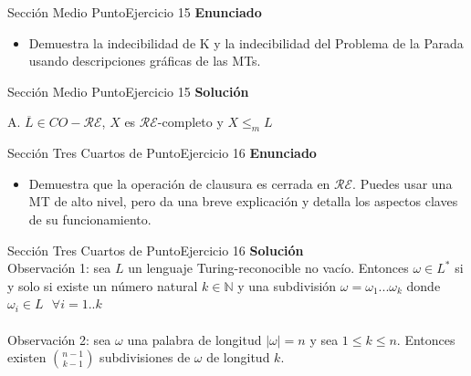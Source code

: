 \documentclass[10pt, envcountsect, presentation, aspectratio=169]{beamer}
\newcommand{\lr}{\ensuremath{\mathcal {RE}}}
\begin{document}
\begin{frame}{Sección Medio Punto}{Ejercicio 15}
    \textbf{Enunciado}
    \begin{itemize}
        \item Demuestra la indecibilidad de K y la indecibilidad del Problema de la Parada usando descripciones gráficas de las MTs.
    \end{itemize}
\end{frame}


\begin{frame}{Sección Medio Punto}{Ejercicio 15}
    \textbf{Solución}\\
    \begin{center}
        A. $\overline{L} \in CO-\lr$, $X$ es \lr-completo y $X \le_m  L$
    \end{center}
    
    
\end{frame}


\begin{frame}{Sección Tres Cuartos de Punto}{Ejercicio 16}
    \textbf{Enunciado}
    \begin{itemize}
        \item Demuestra que la operación de clausura es cerrada en $\lr$. Puedes usar una MT de alto nivel, pero da una breve explicación y detalla los aspectos claves de su funcionamiento.
    \end{itemize}
\end{frame}


\begin{frame}{Sección Tres Cuartos de Punto}{Ejercicio 16}
    \textbf{Solución}\\
    Observación 1: sea $L$ un lenguaje Turing-reconocible no vacío. 
    Entonces $\omega \in L^*$ si y solo si existe un número natural $k \in \mathbb{N}$ y una subdivisión $\omega = \omega_1...\omega_k$ donde $\omega_i \in L \text{ } \forall i = 1..k$\\~\\

    Observación 2: sea $\omega$ una palabra de longitud $|\omega|=n$ y sea $1 \leq k \leq n$.
    Entonces existen ${n-1}\choose{k-1}$ subdivisiones de $\omega$ de longitud $k$.
\end{frame}
\end{document}
